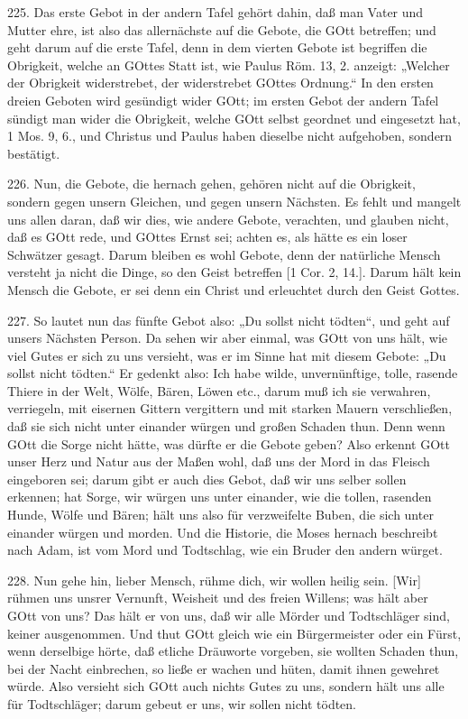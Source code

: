 225. Das erste Gebot in der andern Tafel gehört dahin, daß man Vater und Mutter ehre, ist also das allernächste auf die Gebote, die GOtt betreffen; und geht darum auf die erste Tafel, denn in dem vierten Gebote ist begriffen die Obrigkeit, welche an GOttes Statt ist, wie Paulus Röm. 13, 2. anzeigt: „Welcher der Obrigkeit widerstrebet, der widerstrebet GOttes Ordnung.“ In den ersten dreien Geboten wird gesündigt wider GOtt; im ersten Gebot der andern Tafel sündigt man wider die Obrigkeit, welche GOtt selbst geordnet und eingesetzt hat, 1 Mos. 9, 6., und Christus und Paulus haben dieselbe nicht aufgehoben, sondern bestätigt.

226. Nun, die Gebote, die hernach gehen, gehören nicht auf die Obrigkeit, sondern gegen unsern Gleichen, und gegen unsern Nächsten. Es fehlt und mangelt uns allen daran, daß wir dies, wie andere Gebote, verachten, und glauben nicht, daß es GOtt rede, und GOttes Ernst sei; achten es, als hätte es ein loser Schwätzer gesagt. Darum bleiben es wohl Gebote, denn der natürliche Mensch versteht ja nicht die Dinge, so den Geist betreffen [1 Cor. 2, 14.]. Darum hält kein Mensch die Gebote, er sei denn ein Christ und erleuchtet durch den Geist Gottes.

227. So lautet nun das fünfte Gebot also: „Du sollst nicht tödten“, und geht auf unsers Nächsten Person. Da sehen wir aber einmal, was GOtt von uns hält, wie viel Gutes er sich zu uns versieht, was er im Sinne hat mit diesem Gebote: „Du sollst nicht tödten.“ Er gedenkt also: Ich habe wilde, unvernünftige, tolle, rasende Thiere in der Welt, Wölfe, Bären, Löwen etc., darum muß ich sie verwahren, verriegeln, mit eisernen Gittern vergittern und mit starken Mauern verschließen, daß sie sich nicht unter einander würgen und großen Schaden thun. Denn wenn GOtt die Sorge nicht hätte, was dürfte er die Gebote geben? Also erkennt GOtt unser Herz und Natur aus der Maßen wohl, daß uns der Mord in das Fleisch eingeboren sei; darum gibt er auch dies Gebot, daß wir uns selber sollen erkennen; hat Sorge, wir würgen uns unter einander, wie die tollen, rasenden Hunde, Wölfe und Bären; hält uns also für verzweifelte Buben, die sich unter einander würgen und morden. Und die Historie, die Moses hernach beschreibt nach Adam, ist vom Mord und Todtschlag, wie ein Bruder den andern würget.

228. Nun gehe hin, lieber Mensch, rühme dich, wir wollen heilig sein. [Wir] rühmen uns unsrer Vernunft, Weisheit und des freien Willens; was hält aber GOtt von uns? Das hält er von uns, daß wir alle Mörder und Todtschläger sind, keiner ausgenommen. Und thut GOtt gleich wie ein Bürgermeister oder ein Fürst, wenn derselbige hörte, daß etliche Dräuworte vorgeben, sie wollten Schaden thun, bei der Nacht einbrechen, so ließe er wachen und hüten, damit ihnen gewehret würde. Also versieht sich GOtt auch nichts Gutes zu uns, sondern hält uns alle für Todtschläger; darum gebeut er uns, wir sollen nicht tödten.

